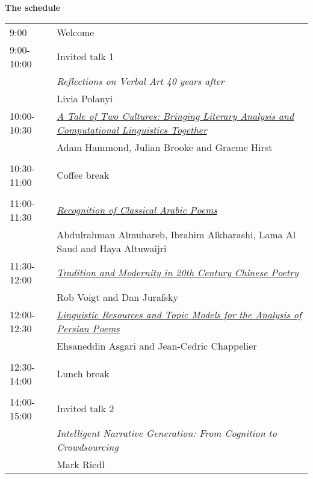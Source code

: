 \setlength{\parindent}{0in}
\setlength{\parskip}{2ex}
\renewcommand{\baselinestretch}{0.87}

\begin{center}
{\Large \bf The schedule}
\end{center}
\vspace{3mm}

\begin{tabular}{p{20mm}p{128mm}}
9:00 & Welcome\\

9:00-10:00 & Invited talk 1\\
 & {\em Reflections on Verbal Art 40 years after}\\
 & Livia Polanyi\\

10:00-10:30 & \hyperlink{page.1}{\em A Tale of Two Cultures: Bringing Literary Analysis and Computational Linguistics Together}\\
 & Adam Hammond, Julian Brooke and Graeme Hirst \\

\\
10:30-11:00 & Coffee break\\
\\

11:00-11:30 & \hyperlink{page.9}{\em Recognition of Classical Arabic Poems}\\
 & Abdulrahman Almuhareb, Ibrahim Alkharashi, Lama Al Saud and Haya Altuwaijri \\

11:30-12:00 & \hyperlink{page.17}{\em Tradition and Modernity in 20th Century Chinese Poetry}\\
 & Rob Voigt and Dan Jurafsky \\

12:00-12:30 & \hyperlink{page.23}{\em Linguistic Resources and Topic Models for the Analysis of Persian Poems}\\
 & Ehsaneddin Asgari and Jean-Cedric Chappelier \\

\\
12:30-14:00 & Lunch break\\
\\

14:00-15:00 & Invited talk 2\\
 & {\em Intelligent Narrative Generation: From Cognition to Crowdsourcing}\\
 & Mark Riedl\\


\end{tabular}

